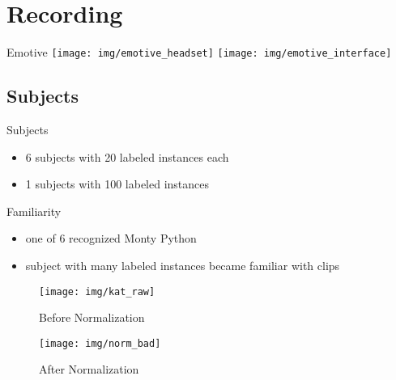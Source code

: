 \section{Recording}
\begin{frame}{ Emotive}
\texttt{[image: img/emotive\_headset]}
\texttt{[image: img/emotive\_interface]}
\end{frame}

\subsection{Subjects}
\begin{frame}{ }
    \begin{block}{Subjects} \begin{itemize}
	\item  6 subjects with 20 labeled instances each
	\item  1 subjects with 100 labeled instances 
    \end{itemize} \end{block}
    \begin{block}{Familiarity} \begin{itemize}
	\item  one of 6 recognized Monty Python
	\item  subject with many labeled instances became familiar with clips
    \end{itemize} \end{block}
\end{frame}

\begin{frame}{ }
    \begin{multicols}{2}
    \begin{figure}
    \texttt{[image: img/kat\_raw]}
    \caption{Before Normalization}
    \end{figure}
    \begin{figure}
    \texttt{[image: img/norm\_bad]}
    \caption{After Normalization}
    \end{figure}
    \end{multicols}
\end{frame}
